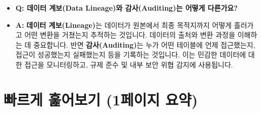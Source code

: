 \documentclass[11pt,a4paper]{article}
\theoremstyle{definition}
\begin{document}
\begin{summarybox}[title=FAQ: 궁금증 해소]
\begin{itemize}
    \item \textbf{Q: 데이터 계보(Data Lineage)와 감사(Auditing)는 어떻게 다른가요?}
    \item \textbf{A:} \textbf{데이터 계보(Lineage)}는 데이터가 원본에서 최종 목적지까지 어떻게 흘러가고 어떤 변환을 거쳤는지 추적하는 것입니다. 데이터의 출처와 변환 과정을 이해하는 데 중요합니다. 반면 \textbf{감사(Auditing)}는 누가 어떤 테이블에 언제 접근했는지, 접근이 성공했는지 실패했는지 등을 기록하는 것입니다. 이는 민감한 데이터에 대한 접근을 모니터링하고, 규제 준수 및 내부 보안 위협 감지에 사용됩니다.
\end{itemize}
\end{summarybox}

\newpage
\section{빠르게 훑어보기 (1페이지 요약)}
\end{document}
